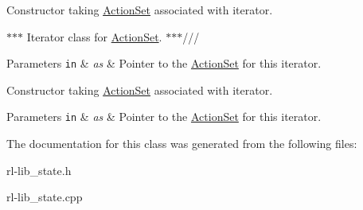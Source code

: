 Constructor taking \hyperlink{classActionSet}{Action\-Set} associated with iterator. 

$\ast$$\ast$$\ast$ Iterator class for \hyperlink{classActionSet}{Action\-Set}. $\ast$$\ast$$\ast$///


\begin{DoxyParams}[1]{Parameters}
\mbox{\tt in}  & {\em as} & Pointer to the \hyperlink{classActionSet}{Action\-Set} for this iterator.\\
\hline
\end{DoxyParams}
Constructor taking \hyperlink{classActionSet}{Action\-Set} associated with iterator. 
\begin{DoxyParams}[1]{Parameters}
\mbox{\tt in}  & {\em as} & Pointer to the \hyperlink{classActionSet}{Action\-Set} for this iterator. \\
\hline
\end{DoxyParams}


The documentation for this class was generated from the following files\-:\begin{DoxyCompactItemize}
\item 
rl-\/lib\-\_\-state.\-h\item 
rl-\/lib\-\_\-state.\-cpp\end{DoxyCompactItemize}
